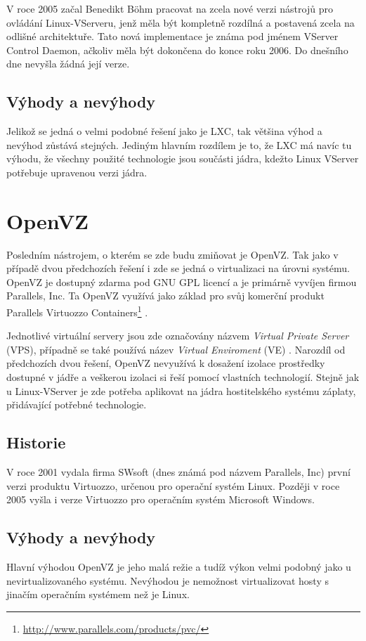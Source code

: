 V roce 2005 začal Benedikt Böhm pracovat na zcela nové verzi nástrojů pro ovládání Linux-VServeru, jenž měla být kompletně rozdílná a postavená zcela na odlišné architektuře. Tato nová implementace je známa pod jménem VServer Control Daemon, ačkoliv měla být dokončena do konce roku 2006. Do dnešního dne nevyšla žádná její verze.

\subsection{Výhody a nevýhody}

Jelikož se jedná o velmi podobné řešení jako je LXC, tak většina výhod a nevýhod zůstává stejných. Jediným hlavním rozdílem je to, že LXC má navíc tu výhodu, že všechny použité technologie jsou součásti jádra, kdežto Linux VServer potřebuje upravenou verzi jádra.

\section{OpenVZ}
Posledním nástrojem, o kterém se zde budu zmiňovat je OpenVZ. Tak jako v případě dvou předchozích řešení i zde se jedná o virtualizaci na úrovni systému. OpenVZ je dostupný zdarma pod GNU GPL licencí a je primárně vyvíjen firmou Parallels, Inc. Ta OpenVZ využívá jako základ pro svůj komerční produkt Parallels Virtuozzo Containers\footnote{\url{http://www.parallels.com/products/pvc/}} \cite{wiki:openvz}.

Jednotlivé virtuální servery jsou zde označovány názvem \emph{Virtual Private Server} (VPS), případně se také používá název \emph{Virtual Enviroment} (VE) \cite{tomecek:ovz}. Narozdíl od předchozích dvou řešení, OpenVZ nevyužívá k dosažení izolace prostředky dostupné v jádře a veškerou izolaci si řeší pomocí vlastních technologií. Stejně jak u Linux-VServer je zde potřeba aplikovat na jádra hostitelského systému záplaty, přidávající potřebné technologie.

\subsection{Historie}
V roce 2001 vydala firma SWsoft (dnes známá pod názvem Parallels, Inc) první verzi produktu Virtuozzo, určenou pro operační systém Linux. Později v roce 2005 vyšla i verze Virtuozzo pro operačním systém Microsoft Windows.

\subsection{Výhody a nevýhody}
Hlavní výhodou OpenVZ je jeho malá režie a tudíž výkon velmi podobný jako u nevirtualizovaného systému. Nevýhodou je nemožnost virtualizovat hosty s jinačím operačním systémem než je Linux.

